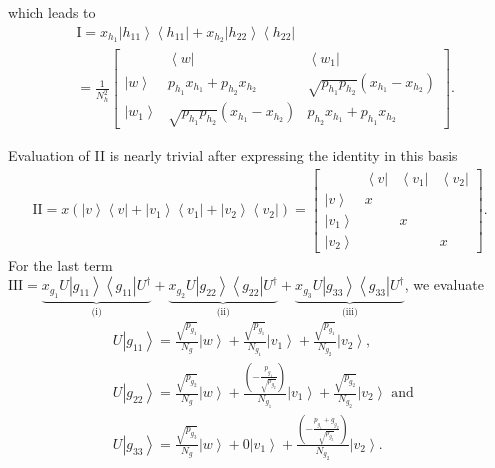 \documentclass{article}
\begin{document}
which leads to 
\begin{align*}
&\text{I}  =x_{h_{1}}\left|h_{11}\right\rangle \left\langle h_{11}\right|+x_{h_{2}}\left|h_{22}\right\rangle \left\langle h_{22}\right|\\
&=\frac{1}{N_{h}^{2}}\left[\begin{array}{c|cc}
& \left\langle w\right| & \left\langle w_{1}\right|\\
\hline \left|w\right\rangle  & p_{h_{1}}x_{h_{1}}+p_{h_{2}}x_{h_{2}} & \sqrt{p_{h_{1}}p_{h_{2}}}(x_{h_{1}}-x_{h_{2}})\\
\left|w_{1}\right\rangle  & \sqrt{p_{h_{1}}p_{h_{2}}}(x_{h_{1}}-x_{h_{2}}) & p_{h_{2}}x_{h_{1}}+p_{h_{1}}x_{h_{2}}
\end{array}\right].
\end{align*}

Evaluation
of II is nearly trivial after expressing the identity in this basis
\begin{align*}
\text{II}  =x(\left|v\right\rangle \left\langle v\right|+\left|v_{1}\right\rangle \left\langle v_{1}\right|+\left|v_{2}\right\rangle \left\langle v_{2}\right|)=\left[\begin{array}{c|ccc}
& \left\langle v\right| & \left\langle v_{1}\right| & \left\langle v_{2}\right|\\
\hline \left|v\right\rangle  & x\\
\left|v_{1}\right\rangle  &  & x\\
\left|v_{2}\right\rangle  &  &  & x
\end{array}\right].
\end{align*}
For the last term 
$
\text{III}=\underbrace{x_{g_{1}}U\left|g_{11}\right\rangle \left\langle g_{11}\right|U^{\dagger}}_{\text{(i)}}+\underbrace{x_{g_{2}}U\left|g_{22}\right\rangle \left\langle g_{22}\right|U^{\dagger}}_{\text{(ii)}}+\underbrace{x_{g_{3}}U\left|g_{33}\right\rangle \left\langle g_{33}\right|U^{\dagger}}_{\text{(iii)}}
$, 
we evaluate 
\begin{align*}
&U\left|g_{11}\right\rangle   =\frac{\sqrt{p_{g_{1}}}}{N_{g}}\left|w\right\rangle +\frac{\sqrt{p_{g_{1}}}}{N_{g_{1}}}\left|v_{1}\right\rangle +\frac{\sqrt{p_{g_{1}}}}{N_{g_{2}}}\left|v_{2}\right\rangle, \\
&U\left|g_{22}\right\rangle   =\frac{\sqrt{p_{g_{2}}}}{N_{g}}\left|w\right\rangle +\frac{\left(-\frac{p_{g_{1}}}{\sqrt{p_{g_{2}}}}\right)}{N_{g_{1}}}\left|v_{1}\right\rangle +\frac{\sqrt{p_{g_{2}}}}{N_{g_{2}}}\left|v_{2}\right\rangle \text{ and } \\
&U\left|g_{33}\right\rangle   =\frac{\sqrt{p_{g_{3}}}}{N_{g}}\left|w\right\rangle +0\left|v_{1}\right\rangle +\frac{\left(-\frac{p_{g_{1}}+g_{g_{2}}}{\sqrt{p_{g_{3}}}}\right)}{N_{g_{2}}}\left|v_{2}\right\rangle .
\end{align*}
\end{document}

